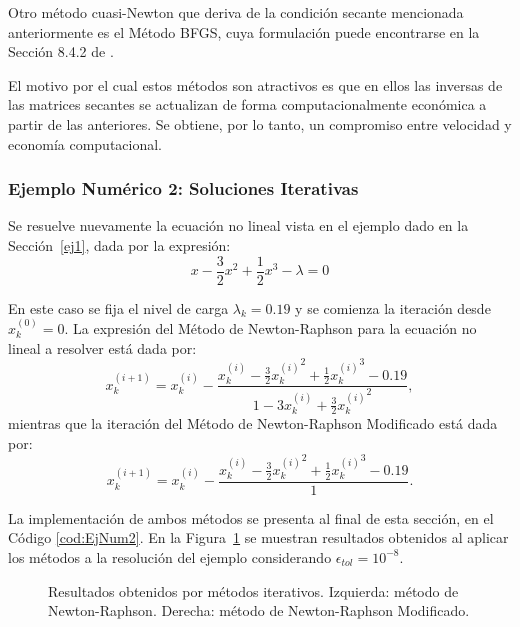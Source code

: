 Otro método cuasi-Newton que deriva de la condición secante mencionada anteriormente es el Método BFGS, cuya formulación puede encontrarse en la Sección 8.4.2 de \citep{Bathe2014}.

El motivo por el cual estos métodos son atractivos es que en ellos las inversas de las matrices secantes se actualizan de forma computacionalmente económica a partir de las anteriores. Se obtiene, por lo tanto, un compromiso entre velocidad y economía computacional.

\subsubsection{Ejemplo Numérico 2: Soluciones Iterativas}

Se resuelve nuevamente la ecuación no lineal vista en el ejemplo dado en la Sección~\ref{ej1}, dada por la expresión:
%
\begin{equation}
x-\frac{3}{2}x^2+\frac{1}{2}x^3-\lambda=0
\end{equation}

En este caso se fija el nivel de carga $\lambda_k=0.19$ y se comienza la iteración desde $x_k^{(0)}=0$. %
%
La expresión del Método de Newton-Raphson para la ecuación no lineal a resolver está dada por:
%
\begin{equation}
x_k^{(i+1)}=x_k^{(i)}-\frac{x_k^{(i)}-\frac{3}{2}{x_k^{(i)}}^2+\frac{1}{2}{x_k^{(i)}}^3-0.19 }{1-3x_k^{(i)}+\frac{3}{2}{x_k^{(i)}}^2},
\end{equation}
%
mientras que la iteración del Método de Newton-Raphson Modificado está dada por:
%
\begin{equation}
x_k^{(i+1)}=x_k^{(i)}-\frac{x_k^{(i)}-\frac{3}{2}{x_k^{(i)}}^2+\frac{1}{2}{x_k^{(i)}}^3-0.19 }{1}.
\end{equation}

La implementación de ambos métodos se presenta al final de esta sección, en el Código \ref{cod:EjNum2}. %
%
En la Figura~\ref{fig:fig4} se muestran resultados obtenidos al aplicar los métodos a la resolución del ejemplo considerando $\epsilon_{tol}=10^{-8}$. %
%

\begin{figure}[htb]
	\centering
	\resizebox{\textwidth}{!}{}
	\caption{Resultados obtenidos por métodos iterativos. Izquierda: método de Newton-Raphson. Derecha: método de Newton-Raphson Modificado.}
	\label{fig:fig4}
\end{figure}

